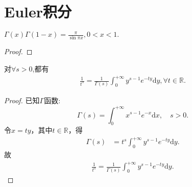 \documentclass[../../main.tex]{subfiles}
\begin{document}
\section{Euler积分}

\begin{theorem}[余元公式]\label{theorem:余元公式}
$\Gamma(x)\Gamma(1-x)=\frac{\pi}{\sin\pi x},0<x<1.$
\end{theorem}
\begin{proof}


\end{proof}

\begin{proposition}\label{proposition:分式化积分-Gamma函数相关性质}
对$\forall s>0$,都有
\begin{align}\label{euqation:将分式化成积分形式}
\frac{1}{t^s}=\frac{1}{\Gamma \left( s \right)}\int_0^{+\infty}{y^{s-1}e^{-ty}\mathrm{d}y},\forall t\in \mathbb{R}.
\end{align}
\end{proposition}
\begin{proof}
已知$\Gamma $函数:\[\Gamma \left( s \right) =\int_0^{+\infty}{x^{s-1}e^{-x}\mathrm{d}x},\quad s>0.\]
令$x=ty$，其中$t\in \mathbb{R}$，得
\begin{align*}
\Gamma \left( s \right) &= t^s\int_0^{+\infty}{y^{s-1}e^{-ty}\mathrm{d}y} .
\end{align*}
故
\begin{align*}
\frac{1}{t^s}=\frac{1}{\Gamma \left( s \right)}\int_0^{+\infty}{y^{s-1}e^{-ty}\mathrm{d}y}.
\end{align*}

\end{proof}
\end{document}
